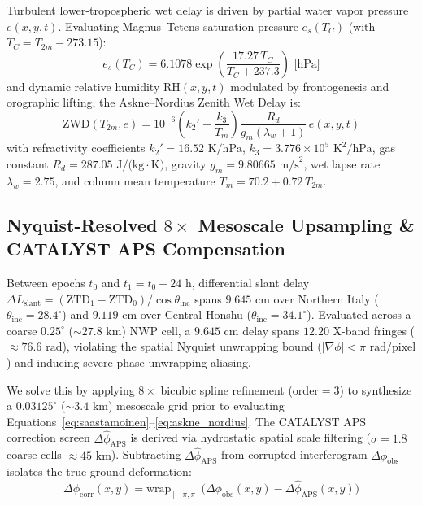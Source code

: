 \documentclass[10pt,twocolumn,letterpaper]{article}
\begin{document}
Turbulent lower-tropospheric wet delay is driven by partial water vapor pressure $e(x,y,t)$. Evaluating Magnus--Tetens saturation pressure $e_s(T_C)$ (with $T_C = T_{2m} - 273.15$):
\begin{equation}
    e_s(T_C) = 6.1078 \exp\!\left(\frac{17.27\,T_C}{T_C + 237.3}\right) \text{ [hPa]}
\end{equation}
and dynamic relative humidity $\text{RH}(x,y,t)$ modulated by frontogenesis and orographic lifting, the Askne--Nordius Zenith Wet Delay is:
\begin{equation}
    \text{ZWD}(T_{2m}, e) = 10^{-6} \left(k_2' + \frac{k_3}{T_m}\right) \frac{R_d}{g_m (\lambda_w + 1)} \, e(x,y,t)
    \label{eq:askne_nordius}
\end{equation}
with refractivity coefficients $k_2' = 16.52\text{ K/hPa}$, $k_3 = 3.776 \times 10^5\text{ K}^2/\text{hPa}$, gas constant $R_d = 287.05\text{ J/(kg}\cdot\text{K)}$, gravity $g_m = 9.80665\text{ m/s}^2$, wet lapse rate $\lambda_w = 2.75$, and column mean temperature $T_m = 70.2 + 0.72\,T_{2m}$.

\subsection{Nyquist-Resolved $8\times$ Mesoscale Upsampling \& CATALYST APS Compensation}
Between epochs $t_0$ and $t_1 = t_0 + 24\text{ h}$, differential slant delay $\Delta L_{\text{slant}} = (\text{ZTD}_1 - \text{ZTD}_0)/\cos\theta_{\text{inc}}$ spans $9.645\text{ cm}$ over Northern Italy ($\theta_{\text{inc}} = 28.4^\circ$) and $9.119\text{ cm}$ over Central Honshu ($\theta_{\text{inc}} = 34.1^\circ$). Evaluated across a coarse $0.25^\circ$ ($\sim 27.8\text{ km}$) NWP cell, a $9.645\text{ cm}$ delay spans $12.20$ X-band fringes ($\approx 76.6\text{ rad}$), violating the spatial Nyquist unwrapping bound ($\lvert\nabla\phi\rvert < \pi\text{ rad/pixel}$) and inducing severe phase unwrapping aliasing.

We solve this by applying $8\times$ bicubic spline refinement ($\text{order}=3$) to synthesize a $0.03125^\circ$ ($\sim 3.4\text{ km}$) mesoscale grid prior to evaluating Equations~\eqref{eq:saastamoinen}--\eqref{eq:askne_nordius}. The CATALYST APS correction screen $\Delta\hat{\phi}_{\text{APS}}$ is derived via hydrostatic spatial scale filtering ($\sigma = 1.8$ coarse cells $\approx 45\text{ km}$). Subtracting $\Delta\hat{\phi}_{\text{APS}}$ from corrupted interferogram $\Delta\phi_{\text{obs}}$ isolates the true ground deformation:
\begin{equation}
    \Delta\phi_{\text{corr}}(x,y) = \text{wrap}_{[-\pi,\pi]}\!\Big(\Delta\phi_{\text{obs}}(x,y) - \Delta\hat{\phi}_{\text{APS}}(x,y)\Big)
\end{equation}
\end{document}
